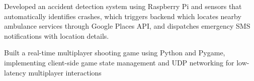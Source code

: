 \begin{cventries}
  \cventry
    {  }{}{}{}
    {
      \begin{cvitems}
        Developed an accident detection system using Raspberry Pi and sensors that automatically identifies crashes,
        which triggers backend which locates nearby ambulance services through Google Places API, and dispatches emergency SMS notifications with location details.
      \end{cvitems}
    }
  \cventry
    {  }{}{}{}
    {
      \begin{cvitems}
        {Built a real-time multiplayer shooting game using Python and Pygame, implementing client-side game state management and UDP networking for low-latency multiplayer interactions}
      \end{cvitems}
    }
\end{cventries}